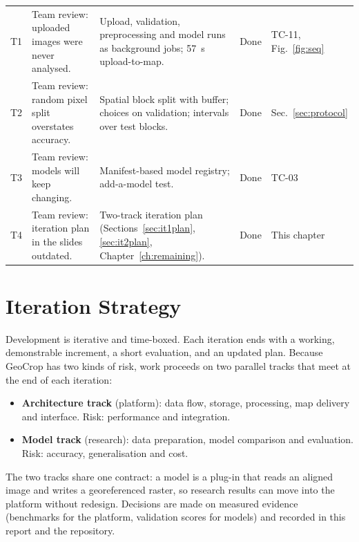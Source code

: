 \begin{table}[htbp]
\begin{tabularx}{\textwidth}{L{0.8cm} L{3.6cm} Y L{1.3cm} L{1.7cm}}
T1 & Team review: uploaded images were never analysed. & Upload, validation, preprocessing and model runs as background jobs; 57~s upload-to-map. & Done & TC-11, Fig.~\ref{fig:seq}\\
T2 & Team review: random pixel split overstates accuracy. & Spatial block split with buffer; choices on validation; intervals over test blocks. & Done & Sec.~\ref{sec:protocol}\\
T3 & Team review: models will keep changing. & Manifest-based model registry; add-a-model test. & Done & TC-03\\
T4 & Team review: iteration plan in the slides outdated. & Two-track iteration plan (Sections~\ref{sec:it1plan}, \ref{sec:it2plan}, Chapter~\ref{ch:remaining}). & Done & This chapter\\
\bottomrule
\end{tabularx}
\end{table}

\section{Iteration Strategy}
Development is iterative and time-boxed. Each iteration ends with a working, demonstrable increment,
a short evaluation, and an updated plan. Because GeoCrop has two kinds of risk, work proceeds on two
parallel tracks that meet at the end of each iteration:
\begin{itemize}
  \item \textbf{Architecture track} (platform): data flow, storage, processing, map delivery and
        interface. Risk: performance and integration.
  \item \textbf{Model track} (research): data preparation, model comparison and evaluation. Risk:
        accuracy, generalisation and cost.
\end{itemize}
The two tracks share one contract: a model is a plug-in that reads an aligned image and writes a
georeferenced raster, so research results can move into the platform without redesign.
Decisions are made on measured evidence (benchmarks for the platform, validation scores for models)
and recorded in this report and the repository.

